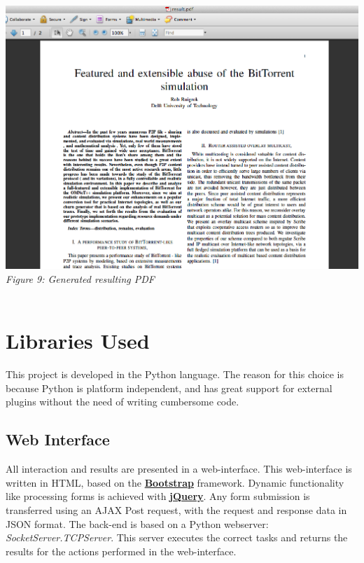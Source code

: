 \documentclass[12pt]{article}
\begin{document}
\includegraphics[width=17cm]{../screenshots/example-pdf.png}
\textit{\\Figure 9: Generated resulting PDF}\\\\


\section{Libraries Used}
This project is developed in the Python language. The reason for this choice is because Python is platform independent, and has great support for external plugins without the need of writing cumbersome code.

\subsection{Web Interface}
All interaction and results are presented in a web-interface. This web-interface is written in HTML, based on the \textbf{\href{http://getbootstrap.com/}{Bootstrap}} framework. Dynamic functionality like processing forms is achieved with \textbf{\href{http://jquery.com/}{jQuery}}. Any form submission is transferred using an AJAX Post request, with the request and response data in JSON format. The back-end is based on a Python webserver: \textit{SocketServer.TCPServer}. This server executes the correct tasks and returns the results for the actions performed in the web-interface.
\end{document}
